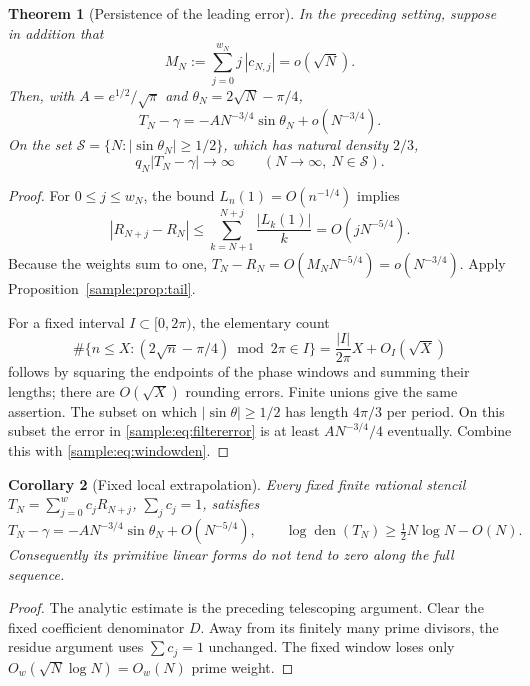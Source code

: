 \documentclass[11pt,a4paper]{article}
\DeclareMathOperator{\den}{den}
\newtheorem{theorem}{Theorem}[section]
\newtheorem{corollary}[theorem]{Corollary}
\theoremstyle{definition}
\theoremstyle{remark}
\numberwithin{equation}{section}
\begin{document}
\begin{theorem}[Persistence of the leading error]\label{sample:thm:filtererror}
In the preceding setting, suppose in addition that
\begin{equation}\label{sample:eq:momentcondition}
M_N:=\sum_{j=0}^{w_N}j\,|c_{N,j}|=o(\sqrt N).
\end{equation}
Then, with $A=e^{1/2}/\sqrt\pi$ and
$\theta_N=2\sqrt N-\pi/4$,
\begin{equation}\label{sample:eq:filtererror}
T_N-\gamma=-A N^{-3/4}\sin\theta_N+o(N^{-3/4}).
\end{equation}
On the set $\mathcal S=\{N:|\sin\theta_N|\ge1/2\}$, which has natural
density $2/3$,
\begin{equation}\label{sample:eq:residualgrows}
q_N|T_N-\gamma|\longrightarrow\infty
\qquad(N\to\infty,\ N\in\mathcal S).
\end{equation}
\end{theorem}
\begin{proof}
For $0\le j\le w_N$, the bound $L_n(1)=O(n^{-1/4})$ implies
\[
|R_{N+j}-R_N|
\le\sum_{k=N+1}^{N+j}\frac{|L_k(1)|}{k}
=O(jN^{-5/4}).
\]
Because the weights sum to one,
$T_N-R_N=O(M_NN^{-5/4})=o(N^{-3/4})$.
Apply Proposition~\ref{sample:prop:tail}.

For a fixed interval $I\subset[0,2\pi)$, the elementary count
\[
\#\{n\le X:(2\sqrt n-\pi/4)\bmod2\pi\in I\}
=\frac{|I|}{2\pi}X+O_I(\sqrt X)
\]
follows by squaring the endpoints of the phase windows and summing
their lengths; there are $O(\sqrt X)$ rounding errors. Finite unions
give the same assertion. The subset on which $|\sin\theta|\ge1/2$
has length $4\pi/3$ per period. On this subset the error in
\eqref{sample:eq:filtererror} is at least $A N^{-3/4}/4$ eventually.
Combine this with \eqref{sample:eq:windowden}.
\end{proof}

\begin{corollary}[Fixed local extrapolation]\label{sample:cor:fixedstencil}
Every fixed finite rational stencil
$T_N=\sum_{j=0}^w c_jR_{N+j}$, $\sum_jc_j=1$, satisfies
\[
T_N-\gamma=-A N^{-3/4}\sin\theta_N+O(N^{-5/4}),
\qquad
\log\den(T_N)\ge\tfrac12N\log N-O(N).
\]
Consequently its primitive linear forms do not tend to zero along the
full sequence.
\end{corollary}
\begin{proof}
The analytic estimate is the preceding telescoping argument. Clear the
fixed coefficient denominator $D$. Away from its finitely many prime
divisors, the residue argument uses $\sum c_j=1$ unchanged. The fixed
window loses only $O_w(\sqrt N\log N)=O_w(N)$ prime weight.
\end{proof}
\end{document}
